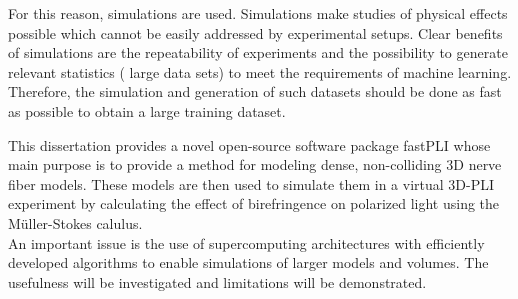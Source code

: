 \par
% 
For this reason, simulations are used.
Simulations make studies of physical effects possible which cannot be easily addressed by experimental setups.
Clear benefits of simulations are the repeatability of experiments and the possibility to generate relevant statistics (\ie{} large data sets) to meet \eg{} the requirements of machine learning.
Therefore, the simulation and generation of such datasets should be done as fast as possible to obtain a large training dataset.
\cite{Ginsburger2018, ginsburgerDis2019, Callaghan2019, Menzel2020}
\par
%
This dissertation provides a novel open-source software package \ac{fastPLI} whose main purpose is to provide a method for modeling dense, non-colliding 3D nerve fiber models.
These models are then used to simulate them in a virtual \ac{3D-PLI} experiment by calculating the effect of birefringence on polarized light using the M\"{u}ller-Stokes calulus. \cite{Matuschke2019, Matuschke2021, Reuter2019}\\
An important issue is the use of supercomputing architectures with efficiently developed algorithms to enable simulations of larger models and volumes.
The usefulness will be investigated and limitations will be demonstrated.